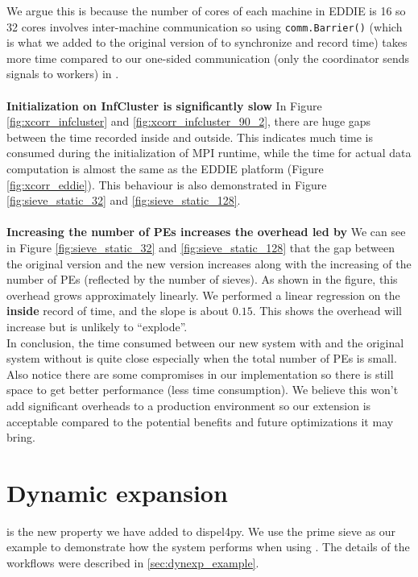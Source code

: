 We argue this is because the number of cores of each machine in EDDIE is 16 so 32 cores involves inter-machine communication so using \lstinline|comm.Barrier()| (which is what we added to the original version of \dpy to synchronize and record time) takes more time compared to our one-sided communication (only the coordinator sends signals to workers) in \tincdep. \\\\
\textbf{Initialization on InfCluster is significantly slow}\quad
In Figure \ref{fig:xcorr_infcluster} and \ref{fig:xcorr_infcluster_90_2}, there are huge gaps between the time recorded inside and outside. This indicates much time is consumed during the initialization of MPI runtime, while the time for actual data computation is almost the same as the EDDIE platform (Figure \ref{fig:xcorr_eddie}). This behaviour is also demonstrated in Figure \ref{fig:sieve_static_32} and \ref{fig:sieve_static_128}. \\\\
\textbf{Increasing the number of PEs increases the overhead led by \tincdep}\quad
We can see in Figure \ref{fig:sieve_static_32} and \ref{fig:sieve_static_128} that the gap between the original version and the new version increases along with the increasing of the number of PEs (reflected by the number of sieves). As shown in the figure, this overhead grows approximately linearly. We performed a linear regression on the \textbf{inside} record of time, and the slope is about $0.15$. This shows the overhead will increase but is unlikely to ``explode''. \\

In conclusion, the time consumed between our new system with \tincdep and the original system without \tincdep is quite close especially when the total number of PEs is small. Also notice there are some compromises in our implementation so there is still space to get better performance (\ie less time consumption). We believe this won't add significant overheads to a production environment so our extension is acceptable compared to the potential benefits and future optimizations it may bring.

\section{Dynamic expansion}
\tDynexp is the new property we have added to dispel4py. We use the prime sieve as our example to demonstrate how the system performs when using \tdynexp. The details of the workflows were described in \ref{sec:dynexp_example}.

